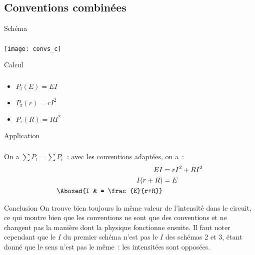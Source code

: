 \documentclass[a4paper, 12pt, final, garamond]{book}
\begin{document}
\subsection{Conventions combinées}
\begin{tcbraster}[raster columns=7, raster equal height=rows]
    \begin{NCdefi}[raster multicolumn=2]{Schéma}
        \subsubsection{}
        \vfill
        \begin{center}
            \texttt{[image: convs\_c]}
        \end{center}
        \vfill
    \end{NCdefi}
    \begin{NCrapp}[raster multicolumn=2]{Calcul}
        \subsubsection{}
        \vfill
        \begin{itemize}[leftmargin=20pt]
            \item $P_{\text{f}}(E) = EI$
            \item $P_{\text{r}}(r) = rI^2$
            \item $P_{\text{r}}(R) = RI^2$
        \end{itemize}
        \vfill
    \end{NCrapp}
    \begin{NCexem}[raster multicolumn=3]{Application}
        \subsubsection{}
        On a $\sum P_{\text{f}} = \sum P_{\text{r}}$~: avec les
        conventions adaptées, on a~:
        \begin{align*}
            EI        & = rI^2 + RI^2\\
            I(r+R)    & = E\\
            \Aboxed{I & = \frac{E}{r+R}}
        \end{align*}
    \end{NCexem}
\end{tcbraster}
\begin{center}
    \begin{NCcexe}[width=\linewidth]{Conclusion}
        On trouve bien toujours la même valeur de l'intensité dans le circuit,
        ce qui montre bien que les conventions ne sont que des conventions et ne
        changent pas la manière dont la physique fonctionne ensuite. Il faut
        noter cependant que le $I$ du premier schéma n'est pas le $I$ des
        schémas 2 et 3, étant donné que le sens n'est pas le même~: les
        intensitées sont opposées.
    \end{NCcexe}
\end{center}
\end{document}
